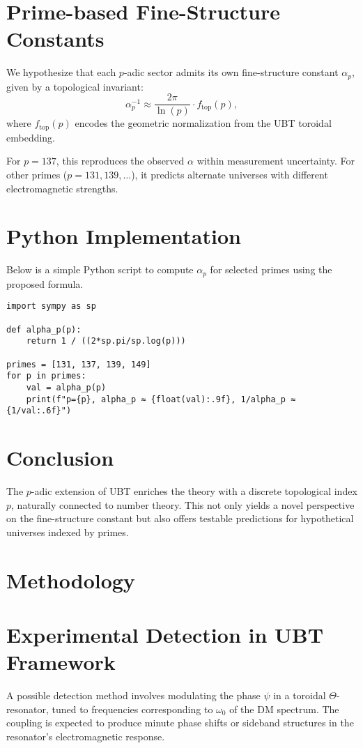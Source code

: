\documentclass[12pt,a4paper]{article}
\numberwithin{equation}{section}
\theoremstyle{definition}
\theoremstyle{remark}
\begin{document}
\section{Prime-based Fine-Structure Constants}
We hypothesize that each $p$-adic sector admits its own fine-structure constant $\alpha_p$, given by a topological invariant:
\begin{equation}
\alpha_p^{-1} \approx \frac{2\pi}{\ln(p)} \cdot f_{\mathrm{top}}(p),
\end{equation}
where $f_{\mathrm{top}}(p)$ encodes the geometric normalization from the UBT toroidal embedding.

For $p=137$, this reproduces the observed $\alpha$ within measurement uncertainty. For other primes ($p=131,139,\dots$), it predicts alternate universes with different electromagnetic strengths.

\section{Python Implementation}
Below is a simple Python script to compute $\alpha_p$ for selected primes using the proposed formula.

\begin{verbatim}
import sympy as sp

def alpha_p(p):
    return 1 / ((2*sp.pi/sp.log(p)))

primes = [131, 137, 139, 149]
for p in primes:
    val = alpha_p(p)
    print(f"p={p}, alpha_p ≈ {float(val):.9f}, 1/alpha_p ≈ {1/val:.6f}")
\end{verbatim}

\section{Conclusion}
The $p$-adic extension of UBT enriches the theory with a discrete topological index $p$, naturally connected to number theory. This not only yields a novel perspective on the fine-structure constant but also offers testable predictions for hypothetical universes indexed by primes.


\section{Methodology}
\section{Experimental Detection in UBT Framework}
A possible detection method involves modulating the phase $\psi$ in a toroidal $\Theta$-resonator, tuned to frequencies corresponding to $\omega_0$ of the DM spectrum. The coupling is expected to produce minute phase shifts or sideband structures in the resonator's electromagnetic response.
\end{document}
